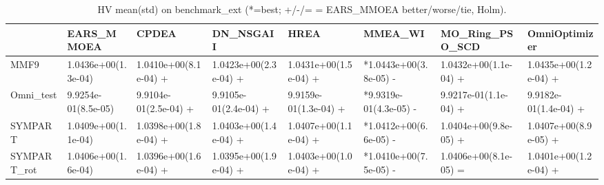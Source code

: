 \begin{table}[t]
\centering
\caption{HV mean(std) on benchmark_ext (*=best; +/-/= = EARS_MMOEA better/worse/tie, Holm).}
\label{tab:benchmark_ext_HV}
\begin{tabular}{llllllll}
\toprule
 & EARS\_MMOEA & CPDEA & DN\_NSGAII & HREA & MMEA\_WI & MO\_Ring\_PSO\_SCD & OmniOptimizer \\
\midrule
MMF9 & 1.0436e+00(1.3e-04) & 1.0410e+00(8.1e-04) + & 1.0423e+00(2.3e-04) + & 1.0431e+00(1.5e-04) + & *1.0443e+00(3.8e-05) - & 1.0432e+00(1.1e-04) + & 1.0435e+00(1.2e-04) + \\
Omni\_test & 9.9254e-01(8.5e-05) & 9.9104e-01(2.5e-04) + & 9.9105e-01(2.4e-04) + & 9.9159e-01(1.3e-04) + & *9.9319e-01(4.3e-05) - & 9.9217e-01(1.1e-04) + & 9.9182e-01(1.4e-04) + \\
SYMPART & 1.0409e+00(1.1e-04) & 1.0398e+00(1.8e-04) + & 1.0403e+00(1.4e-04) + & 1.0407e+00(1.1e-04) + & *1.0412e+00(6.6e-05) - & 1.0404e+00(9.8e-05) + & 1.0407e+00(8.9e-05) + \\
SYMPART\_rot & 1.0406e+00(1.6e-04) & 1.0396e+00(1.6e-04) + & 1.0395e+00(1.9e-04) + & 1.0403e+00(1.0e-04) + & *1.0410e+00(7.5e-05) - & 1.0406e+00(8.1e-05) = & 1.0401e+00(1.2e-04) + \\
\bottomrule
\end{tabular}
\end{table}
